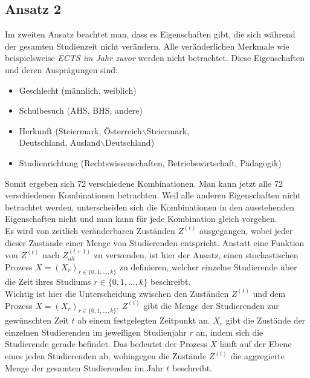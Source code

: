 \subsection{Ansatz 2}
\label{sec:appr2}

Im zweiten Ansatz beachtet man, dass es Eigenschaften gibt, die sich w\"ahrend der gesamten Studienzeit nicht verändern. Alle ver\"anderlichen Merkmale
wie beispielsweise \textit{ECTS im Jahr zuvor} werden nicht betrachtet.
Diese Eigenschaften und deren Ausprägungen sind:

\begin{itemize}
  \item Geschlecht (männlich, weiblich)
  \item Schulbesuch (AHS, BHS, andere)
  \item Herkunft (Steiermark, Österreich$\backslash$Steiermark, \\
        Deutschland, Ausland$\backslash$Deutschland)
  \item Studienrichtung (Rechtswissenschaften, Betriebswirtschaft, P\"adagogik)
\end{itemize}

Somit ergeben sich 72 verschiedene Kombinationen. Man kann jetzt alle 72 verschiedenen
Kombinationen betrachten. Weil alle anderen Eigenschaften nicht betrachtet werden, unterscheiden sich die Kombinationen in den
ausstehenden Eigenschaften nicht und man kann für jede Kombination gleich vorgehen. \\


Es wird von zeitlich ver\"anderbaren Zuständen $Z^{(t)}$ ausgegangen, wobei jeder dieser
Zustände einer Menge von Studierenden entspricht. Anstatt eine Funktion von $Z^{(t)}$ nach $Z_{alt}^{(t+1)}$
zu verwenden, ist hier der Ansatz, einen stochastischen Prozess $X = (X_r)_{r \in \{ 0,1, \dots, k \} }$ zu definieren, welcher einzelne Studierende \"uber
die Zeit ihres Studiums $r \in \{0,1, \dots , k\}$ beschreibt. \\

Wichtig ist hier die Unterscheidung zwischen den Zuständen $Z^{(t)}$ und dem Prozess $X = (X_r)_{r \in \{ 0,1, \dots, k \} }$.
$Z^{(t)}$ gibt die Menge der Studierenden zur gewünschten Zeit $t$ ab einem festgelegten Zeitpunkt an.
$X_r$ gibt die Zustände der einzelnen Studierenden im jeweiligen Studienjahr $r$ an, indem sich die Studierende gerade befindet.
Das bedeutet der Prozess $X$ l\"auft auf der Ebene eines jeden Studierenden ab, wohingegen
die Zust\"ande $Z^{(t)}$ die aggregierte Menge der gesamten Studierenden im Jahr $t$ beschreibt.



